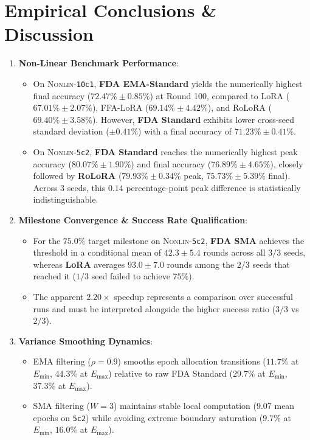 \documentclass[10pt,a4paper]{article}
\begin{document}
\section{Empirical Conclusions \& Discussion}

\begin{enumerate}
    \item \textbf{Non-Linear Benchmark Performance}:
    \begin{itemize}
        \item On \textsc{Nonlin}-\texttt{10c1}, \textbf{FDA EMA-Standard} yields the numerically highest final accuracy ($72.47\% \pm 0.85\%$) at Round 100, compared to LoRA ($67.01\% \pm 2.07\%$), FFA-LoRA ($69.14\% \pm 4.42\%$), and RoLoRA ($69.40\% \pm 3.58\%$). However, \textbf{FDA Standard} exhibits lower cross-seed standard deviation ($\pm 0.41\%$) with a final accuracy of $71.23\% \pm 0.41\%$.
        \item On \textsc{Nonlin}-\texttt{5c2}, \textbf{FDA Standard} reaches the numerically highest peak accuracy ($80.07\% \pm 1.90\%$) and final accuracy ($76.89\% \pm 4.65\%$), closely followed by \textbf{RoLoRA} ($79.93\% \pm 0.34\%$ peak, $75.73\% \pm 5.39\%$ final). Across 3 seeds, this $0.14$ percentage-point peak difference is statistically indistinguishable.
    \end{itemize}

    \item \textbf{Milestone Convergence \& Success Rate Qualification}:
    \begin{itemize}
        \item For the $75.0\%$ target milestone on \textsc{Nonlin}-\texttt{5c2}, \textbf{FDA SMA} achieves the threshold in a conditional mean of $42.3 \pm 5.4$ rounds across all $3/3$ seeds, whereas \textbf{LoRA} averages $93.0 \pm 7.0$ rounds among the $2/3$ seeds that reached it ($1/3$ seed failed to achieve $75\%$).
        \item The apparent $2.20\times$ speedup represents a comparison over successful runs and must be interpreted alongside the higher success ratio ($3/3$ vs $2/3$).
    \end{itemize}

    \item \textbf{Variance Smoothing Dynamics}:
    \begin{itemize}
        \item EMA filtering ($\rho=0.9$) smooths epoch allocation transitions ($11.7\%$ at $E_{\min}$, $44.3\%$ at $E_{\max}$) relative to raw FDA Standard ($29.7\%$ at $E_{\min}$, $37.3\%$ at $E_{\max}$).
        \item SMA filtering ($W=3$) maintains stable local computation ($9.07$ mean epochs on \texttt{5c2}) while avoiding extreme boundary saturation ($9.7\%$ at $E_{\min}$, $16.0\%$ at $E_{\max}$).
    \end{itemize}


\end{enumerate}
\end{document}
